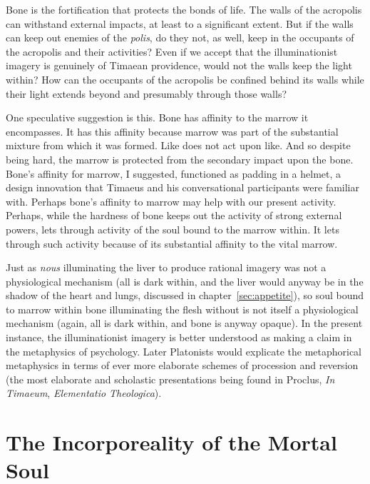 Bone is the fortification that protects the bonds of life. The walls of the acropolis can withstand external impacts, at least to a significant extent. But if the walls can keep out enemies of the \emph{polis}, do they not, as well, keep in the occupants of the acropolis and their activities? Even if we accept that the illuminationist imagery is genuinely of Timaean providence, would not the walls keep the light within? How can the occupants of the acropolis be confined behind its walls while their light extends beyond and presumably through those walls?

One speculative suggestion is this. Bone has affinity to the marrow it encompasses. It has this affinity because marrow was part of the substantial mixture from which it was formed. Like does not act upon like. And so despite being hard, the marrow is protected from the secondary impact upon the bone. Bone's affinity for marrow, I suggested, functioned as padding in a helmet, a design innovation that Timaeus and his conversational participants were familiar with. Perhaps bone's affinity to marrow may help with our present activity. Perhaps, while the hardness of bone keeps out the activity of strong external powers, lets through activity of the soul bound to the marrow within. It lets through such activity because of its substantial affinity to the vital marrow.

Just as \emph{nous} illuminating the liver to produce rational imagery was not a physiological mechanism (all is dark within, and the liver would anyway be in the shadow of the heart and lungs, discussed in chapter~\ref{sec:appetite}), so soul bound to marrow within bone illuminating the flesh without is not itself a physiological mechanism (again, all is dark within, and bone is anyway opaque). In the present instance, the illuminationist imagery is better understood as making a claim in the metaphysics of psychology. Later Platonists would explicate the metaphorical metaphysics in terms of ever more elaborate schemes of procession and reversion (the most elaborate and scholastic presentations being found in Proclus, \emph{In Timaeum}, \emph{Elementatio Theologica}).


\section{The Incorporeality of the Mortal Soul} %
\label{sec:the_incorporeality_of_the_mortal_soul}

